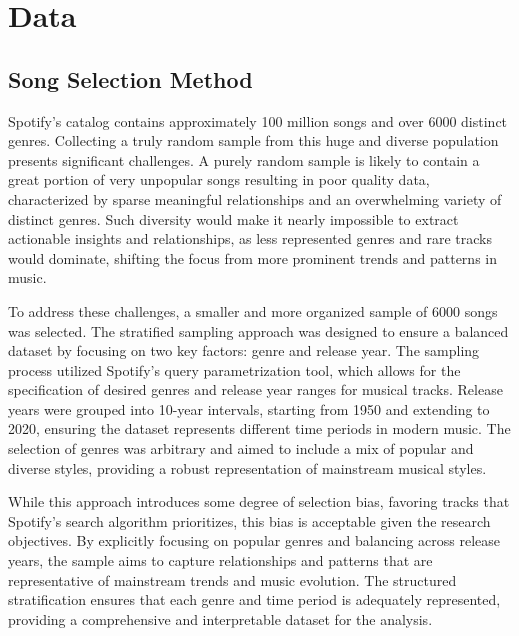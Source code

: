 \chapter{Data}
\label{cha:data}



\section{Song Selection Method}
\label{sec:songselectionmethod}


Spotify’s catalog contains approximately 100 million songs and over 6000
distinct genres. Collecting a truly random sample from this huge and diverse
population presents significant challenges. A purely random sample is likely to
contain a great portion of very unpopular songs resulting in poor quality data,
characterized by sparse meaningful relationships and an overwhelming variety of
distinct genres. Such diversity would make it nearly impossible to extract
actionable insights and relationships, as less represented genres and rare
tracks would dominate, shifting the focus from more prominent trends and
patterns in music.


To address these challenges, a smaller and more organized sample of 6000 songs
was selected. The stratified sampling approach was designed to ensure a
balanced dataset by focusing on two key factors: genre and release year. The
sampling process utilized Spotify's query parametrization tool, which allows
for the specification of desired genres and release year ranges for musical
tracks. Release years were grouped into 10-year intervals, starting from 1950
and extending to 2020, ensuring the dataset represents different time periods
in modern music. The selection of genres was arbitrary and aimed to include a
mix of popular and diverse styles, providing a robust representation of
mainstream musical styles.
 

While this approach introduces some degree of selection bias, favoring tracks
that Spotify's search algorithm prioritizes, this bias is acceptable given the
research objectives. By explicitly focusing on popular genres and balancing
across release years, the sample aims to capture relationships and patterns
that are representative of mainstream trends and music evolution. The
structured stratification ensures that each genre and time period is adequately
represented, providing a comprehensive and interpretable dataset for  the
analysis.


